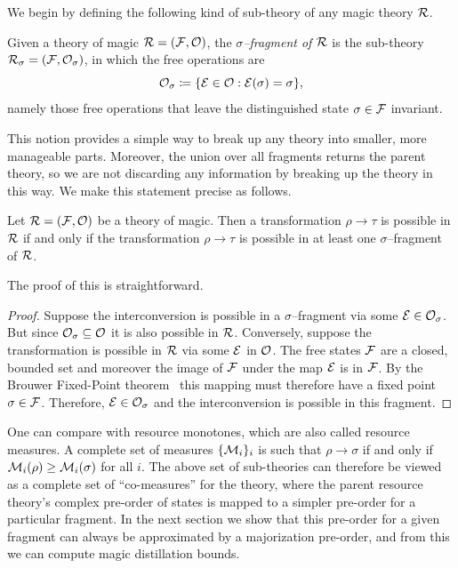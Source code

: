 \documentclass[pra,
aps,
twocolumn,
superscriptaddress,
groupedaddress,
nofootinbib,
reprint
]{revtex4-1}
\begin{document}
 We begin by defining the following kind of sub-theory of any magic theory ${\mathcal R}$.
\begin{definition}\label{def:sigmafrag}
   Given a theory of magic ${\mathcal R} = ({\mathcal F}, {\mathcal O})$, the \emph{$\sigma$--fragment of ${\mathcal R}$} is the sub-theory ${\mathcal R}_\sigma = ({\mathcal F}, {\mathcal O}_\sigma)$, in which the free operations are 
   \begin{equation}
        {\mathcal O}_\sigma \coloneqq \{ {\mathcal E} \in {\mathcal O}: {\mathcal E}(\sigma) = \sigma \},
    \end{equation}
namely those free operations that leave the distinguished state $\sigma \in {\mathcal F}$ invariant.
\end{definition}
This notion provides a simple way to break up any theory into smaller, more manageable parts. Moreover, the union over all fragments returns the parent theory, so we are not discarding any information by breaking up the theory in this way. We make this statement precise as follows.
\begin{theorem}\label{thm:frag}
    Let ${\mathcal R} = ({\mathcal F}, {\mathcal O})$ be a theory of magic.
Then a transformation $\rho \rightarrow \tau$ is possible in ${\mathcal R}$ if and only if the transformation $\rho \rightarrow \tau$ is possible in at least one $\sigma$--fragment of ${\mathcal R}$.
\end{theorem}
The proof of this is straightforward.
\begin{proof}
   Suppose the interconversion is possible in a $\sigma$--fragment via some ${\mathcal E} \in {\mathcal O}_\sigma$. But since ${\mathcal O}_\sigma \subseteq {\mathcal O}$ it is also possible in ${\mathcal R}$. Conversely, suppose the transformation is possible in ${\mathcal R}$ via some ${\mathcal E}$ in ${\mathcal O}$. The free states ${\mathcal F}$ are a closed, bounded set and moreover the image of ${\mathcal F}$ under the map ${\mathcal E}$ is in ${\mathcal F}$. By the Brouwer Fixed-Point theorem~\cite{cit:brouwer} this mapping must therefore have a fixed point $\sigma \in {\mathcal F}$. Therefore, ${\mathcal E} \in {\mathcal O}_\sigma$ and the interconversion is possible in this fragment.
\end{proof}
One can compare with resource monotones, which are also called resource measures. A complete set of measures $\{{\mathcal M}_i\}_i$ is such that $\rho \rightarrow \sigma$ if and only if ${\mathcal M}_i(\rho) \ge {\mathcal M}_i(\sigma)$ for all $i$. The above set of sub-theories can therefore be viewed as a complete set of ``co-measures'' for the theory, where the parent resource theory's complex pre-order of states is mapped to a simpler pre-order for a particular fragment. In the next section we show that this pre-order for a given fragment can always be approximated by a majorization pre-order, and from this we can compute magic distillation bounds.
\end{document}
